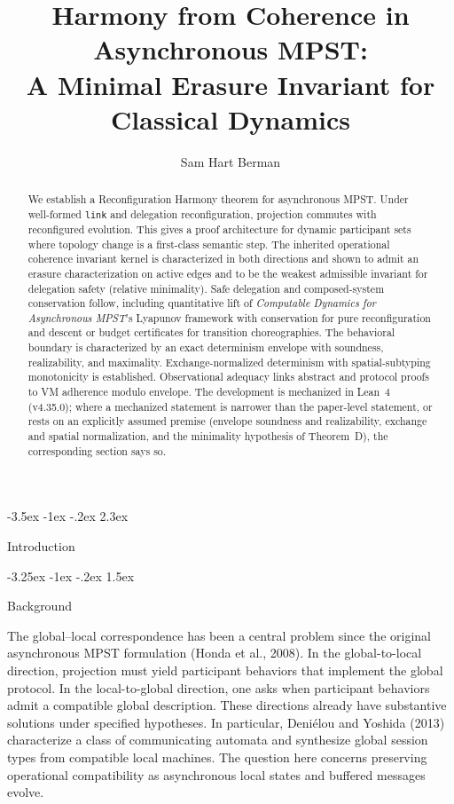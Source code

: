 \documentclass[a4paper,10pt,twocolumn,english]{article}
\title{Harmony from Coherence in Asynchronous MPST:\\A Minimal Erasure Invariant for Classical Dynamics}
\author{Sam Hart Berman}
\date{\empty}
\makeatletter
\renewcommand{\section}{\@startsection{section}{1}{\z@}%
  {-3.5ex \@plus -1ex \@minus -.2ex}%
  {2.3ex}%
  {\raggedright\normalfont\large\bfseries}}
\renewcommand{\subsection}{\@startsection{subsection}{2}{\z@}%
  {-3.25ex \@plus -1ex \@minus -.2ex}%
  {1.5ex}%
  {\raggedright\normalfont\normalsize\bfseries}}
\numberwithin{equation}{section}
\theoremstyle{paperdef}
\theoremstyle{paperplain}
\theoremstyle{paperdef}
\theoremstyle{paperremark}
\theoremstyle{paperdef}
\makeatother
\begin{document}
\maketitle

\begin{abstract}
	We establish a Reconfiguration Harmony theorem for asynchronous MPST. Under well-formed
	\texttt{link} and delegation reconfiguration, projection commutes with reconfigured evolution.
	This gives a proof architecture for dynamic participant sets where topology change is a first-class
	semantic step. The inherited operational coherence invariant kernel is characterized
	in both directions and shown to admit an erasure characterization on active edges and to be the
	weakest admissible invariant for delegation safety (relative minimality). Safe delegation and
	composed-system conservation follow, including quantitative lift of
	\emph{Computable Dynamics for Asynchronous MPST}'s Lyapunov framework with conservation for pure reconfiguration and descent or budget
	certificates for transition choreographies. The behavioral boundary is characterized by an exact
	determinism envelope with soundness, realizability, and maximality. Exchange-normalized determinism
	with spatial-subtyping monotonicity is established. Observational adequacy links abstract and
	protocol proofs to VM adherence modulo envelope. The development is mechanized in Lean~4 (v4.35.0);
	where a mechanized statement is narrower than the paper-level statement, or rests on an explicitly
	assumed premise (envelope soundness and realizability, exchange and spatial normalization, and the
	minimality hypothesis of Theorem~D), the corresponding section says so.
\end{abstract}

\section{Introduction}
\label{sec:introduction}

\subsection{Background}

The global--local correspondence has been a central problem since the original asynchronous
MPST formulation (Honda et al., 2008). In the global-to-local direction, projection must yield
participant behaviors that implement the global protocol. In the local-to-global direction,
one asks when participant behaviors admit a compatible global description. These directions
already have substantive solutions under specified hypotheses. In particular, Deni\'{e}lou and
Yoshida (2013) characterize a class of communicating automata and synthesize global session types
from compatible local machines. The question here concerns preserving operational compatibility
as asynchronous local states and buffered messages evolve.
\end{document}
